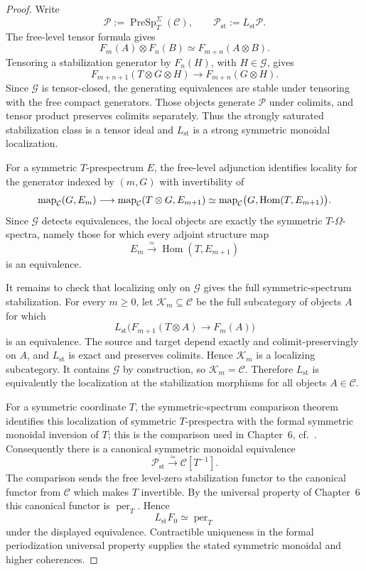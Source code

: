 \begin{proof}
Write
\[
    \mathcal P:=\operatorname{PreSp}^{\Sigma}_T(\mathcal C),
    \qquad
    \mathcal P_{\mathrm{st}}:=L_{\mathrm{st}}\mathcal P.
\]
The free-level tensor formula gives
\[
    F_m(A)\otimes F_n(B)
    \simeq
    F_{m+n}(A\otimes B).
\]
Tensoring a stabilization generator by $F_n(H)$, with $H\in\mathcal G$,
gives
\[
    F_{m+n+1}(T\otimes G\otimes H)
    \longrightarrow
    F_{m+n}(G\otimes H).
\]
Since $\mathcal G$ is tensor-closed, the generating equivalences are stable
under tensoring with the free compact generators.  Those objects generate
$\mathcal P$ under colimits, and tensor product preserves colimits separately.
Thus the strongly saturated stabilization class is a tensor ideal and
$L_{\mathrm{st}}$ is a strong symmetric monoidal localization.

For a symmetric $T$-prespectrum $E$, the free-level adjunction identifies
locality for the generator indexed by $(m,G)$ with invertibility of
\[
    \operatorname{map}_{\mathcal C}(G,E_m)
    \longrightarrow
    \operatorname{map}_{\mathcal C}(T\otimes G,E_{m+1})
    \simeq
    \operatorname{map}_{\mathcal C}
    \bigl(G,\operatorname{Hom}(T,E_{m+1})\bigr).
\]
Since $\mathcal G$ detects equivalences, the local objects are exactly the
symmetric $T$-$\Omega$-spectra, namely those for which every adjoint structure
map
\[
    E_m\xrightarrow{\simeq}\operatorname{Hom}(T,E_{m+1})
\]
is an equivalence.

It remains to check that localizing only on $\mathcal G$ gives the full
symmetric-spectrum stabilization.  For every $m\geq0$, let
$\mathcal K_m\subseteq\mathcal C$ be the full subcategory of objects $A$ for
which
\[
    L_{\mathrm{st}}
    \bigl(F_{m+1}(T\otimes A)\to F_m(A)\bigr)
\]
is an equivalence.  The source and target depend exactly and
colimit-preservingly on $A$, and $L_{\mathrm{st}}$ is exact and preserves
colimits.  Hence $\mathcal K_m$ is a localizing subcategory.  It contains
$\mathcal G$ by construction, so $\mathcal K_m=\mathcal C$.  Therefore
$L_{\mathrm{st}}$ is equivalently the localization at the stabilization
morphisms for all objects $A\in\mathcal C$.

For a symmetric coordinate $T$, the symmetric-spectrum comparison theorem
identifies this localization of symmetric $T$-prespectra with the formal
symmetric monoidal inversion of $T$; this is the comparison used in Chapter~6,
cf.~\cite{RobaloNoncommutativeMotivesI}.  Consequently there is a canonical
symmetric monoidal equivalence
\[
    \mathcal P_{\mathrm{st}}
    \xrightarrow{\simeq}
    \mathcal C[T^{-1}].
\]
The comparison sends the free level-zero stabilization functor to the
canonical functor from $\mathcal C$ which makes $T$ invertible.  By the
universal property of Chapter~6 this canonical functor is
$\operatorname{per}_T$.  Hence
\[
    L_{\mathrm{st}}F_0
    \simeq
    \operatorname{per}_T
\]
under the displayed equivalence.  Contractible uniqueness in the formal
periodization universal property supplies the stated symmetric monoidal and
higher coherences.
\end{proof}

